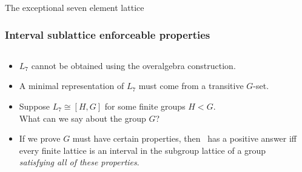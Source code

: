 \begin{frame}[fragile,label=Conclusion,shrink=5]{The exceptional seven element lattice}
  \frametitle{Interval sublattice enforceable properties}
  \begin{columns}
    \begin{column}{0.7\textwidth}
      \begin{itemize}
      \item  $L_7$ cannot be obtained using the overalgebra construction.
        \vskip2mm
      \item<2-> A minimal representation of $L_7$ must come from a transitive $G$-set.
        \vskip2mm
      \item<3-> Suppose $L_7 \cong [H, G]$ for some finite groups $H<G$.\\[4pt]
        What can we say about the group $G$?
        \vskip2mm
      \item<4-> If we prove $G$ must have certain properties, then \FLRP\ has a
        positive answer iff every finite lattice is an interval
        in the subgroup lattice of a group \emph{satisfying all of these properties}.
      \end{itemize}
    \end{column}
    \begin{column}{0.2\textwidth}
      \begin{center}
      \end{center}
    \end{column}
  \end{columns}


\end{frame}
